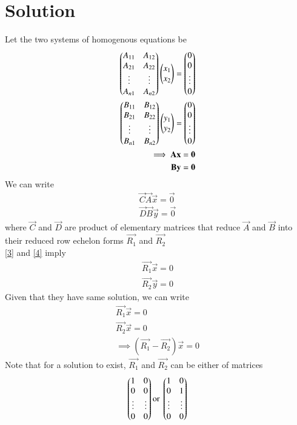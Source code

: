 \documentclass[journal,12pt,twocolumn]{IEEEtran}
\begin{document}
\section{Solution}
Let the two systems of homogenous equations be 
\begin{align}
  \begin{pmatrix}A_{11}&A_{12}\\A_{21}&A_{22}\\ \vdots & \vdots \\A_{n1}&A_{n2}\end{pmatrix}\begin{pmatrix}x_1\\x_2\end{pmatrix}=\begin{pmatrix}0\\0\\ \vdots \\0\end{pmatrix}\\
 \begin{pmatrix}B_{11}&B_{12}\\B_{21}&B_{22}\\ \vdots & \vdots \\B_{n1}&B_{n2}\end{pmatrix}\begin{pmatrix}y_1\\y_2\end{pmatrix}=\begin{pmatrix}0\\0\\ \vdots \\0\end{pmatrix}\\
\implies  \mathbf{A}\mathbf{x}=\mathbf{0}\label{1}\\
 \mathbf{B}\mathbf{y}=\mathbf{0}\label{2}
\end{align}
We can write
\begin{align}
  \vec{C}\vec{A}\vec{x}=\vec{0}\label{3}\\
 \vec{D}\vec{B}\vec{y}=\vec{0}\label{4}
\end{align}
where $\vec{C}$ and $\vec{D}$ are product of elementary matrices that reduce $\vec{A}$ and $\vec{B}$ into their reduced row echelon forms $\vec{R_1}$ and $\vec{R_2}$\\
\eqref{3} and \eqref{4} imply
\begin{align}
    \vec{R_1}\vec{x}=0\\
     \vec{R_2}\vec{y}=0
\end{align}
Given that they have same solution, we can write
\begin{align}
     \vec{R_1}\vec{x}=0\\
     \vec{R_2}\vec{x}=0\\
     \implies (\vec{R_1}-\vec{R_2})\vec{x}=0\label{5}
\end{align}
Note that for a solution to exist, $\vec{R_1}$ and $\vec{R_2}$ can be either of matrices
\begin{align}
    \begin{pmatrix}1&0\\0&0\\\vdots&\vdots\\0&0\end{pmatrix} \text{or } \begin{pmatrix}1&0\\0&1\\\vdots&\vdots\\0&0\end{pmatrix}
\end{align}
\end{document}
